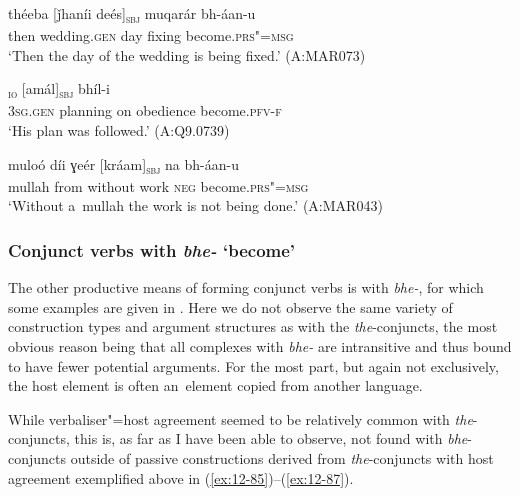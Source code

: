 \begin{exe}
\ex
\label{ex:12-85}
\gll théeba [ǰhaníi deés]\textsubscript{\textsc{sbj}} muqarár bh-áan-u  \\
then wedding.\textsc{gen} day fixing become.\textsc{prs"=msg} \\
\glt `Then the day of the wedding is being fixed.' (A:MAR073)
\end{exe}
\begin{exe}
\ex
\label{ex:12-86}
\textsubscript{\textsc{io}}
     [amál]\textsubscript{\textsc{sbj}} bhíl-i  \\
\textsc{3sg.gen} planning on obedience become.\textsc{pfv-f} \\
\glt `His plan was followed.' (A:Q9.0739)
\end{exe}
\begin{exe}
\ex
\label{ex:12-87}
\gll muloó díi ɣeér [kráam]\textsubscript{\textsc{sbj}} na bh-áan-u  \\
mullah from without work \textsc{neg} become.\textsc{prs"=msg} \\
\glt `Without a~mullah the work is not being done.' (A:MAR043)
\end{exe}

\subsubsection*{Conjunct verbs with \textit{bhe-} `become'}

The other productive means of forming conjunct verbs is with \textit{bhe-}, for which some examples are given in . Here we do not observe the same variety of construction types and argument structures as with the \textit{the}-conjuncts, the most obvious reason being that all complexes with \textit{bhe-} are intransitive and thus bound to have fewer potential arguments. For the most part, but again not exclusively, the host element is often an~element copied from another language. 


While verbaliser"=host agreement seemed to be relatively common with \textit{the}-conjuncts, this is, as far as I have been able to observe, not found with \textit{bhe}-conjuncts outside of passive constructions derived from \textit{the}-conjuncts with host agreement exemplified above in (\ref{ex:12-85})--(\ref{ex:12-87}). 


